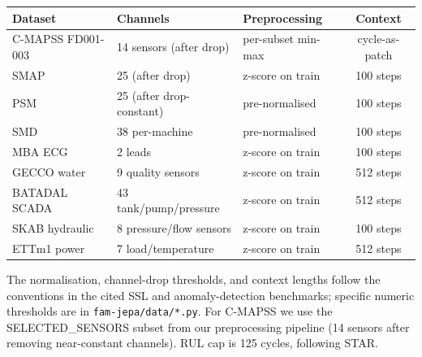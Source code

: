 \documentclass{article}
\begin{document}
\begin{center}
  \small
  \begin{tabular}{lllc}
    \toprule
    Dataset           & Channels                 & Preprocessing      & Context        \\
    \midrule
    C-MAPSS FD001-003 & 14 sensors (after drop)  & per-subset min-max & cycle-as-patch \\
    SMAP              & 25 (after drop)          & z-score on train   & 100 steps      \\
    PSM               & 25 (after drop-constant) & pre-normalised     & 100 steps      \\
    SMD               & 38 per-machine           & pre-normalised     & 100 steps      \\
    MBA ECG           & 2 leads                  & z-score on train   & 100 steps      \\
    GECCO water       & 9 quality sensors        & z-score on train   & 512 steps      \\
    BATADAL SCADA     & 43 tank/pump/pressure    & z-score on train   & 512 steps      \\
    SKAB hydraulic    & 8 pressure/flow sensors  & z-score on train   & 100 steps      \\
    ETTm1 power       & 7 load/temperature       & z-score on train   & 512 steps      \\
    \bottomrule
  \end{tabular}
\end{center}

The normalisation, channel-drop thresholds, and context lengths follow the conventions in the cited SSL and anomaly-detection benchmarks; specific numeric thresholds are in \texttt{fam-jepa/data/*.py}. For C-MAPSS we use the SELECTED\_SENSORS subset from our preprocessing pipeline (14 sensors after removing near-constant channels). RUL cap is 125 cycles, following STAR.
\end{document}
